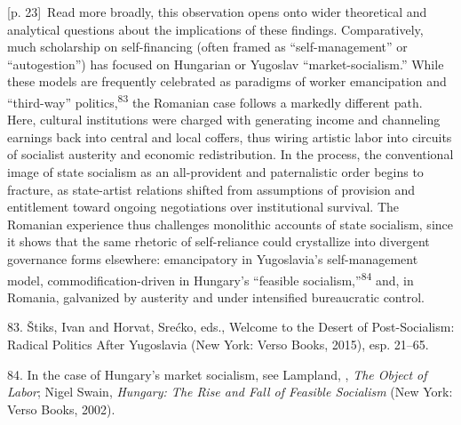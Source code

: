 \documentclass[10pt,a4paper]{article}
\begin{document}
{\scriptsize\color{gray} [p. 23]}\ Read more broadly, this observation opens onto wider theoretical and analytical questions about the implications of these findings. Comparatively, much scholarship on self-financing (often framed as “self-management” or “autogestion”) has focused on Hungarian or Yugoslav “market-socialism.” While these models are frequently celebrated as paradigms of worker emancipation and “third-way” politics,\nobreak\textsuperscript{83} the Romanian case follows a markedly different path. Here, cultural institutions were charged with generating income and channeling earnings back into central and local coffers, thus wiring artistic labor into circuits of socialist austerity and economic redistribution. In the process, the conventional image of state socialism as an all-provident and paternalistic order begins to fracture, as state-artist relations shifted from assumptions of provision and entitlement toward ongoing negotiations over institutional survival. The Romanian experience thus challenges monolithic accounts of state socialism, since it shows that the same rhetoric of self-reliance could crystallize into divergent governance forms elsewhere: emancipatory in Yugoslavia’s self-management model, commodification-driven in Hungary’s “feasible socialism,”\nobreak\textsuperscript{84} and, in Romania, galvanized by austerity and under intensified bureaucratic control.\par{\small 83. Štiks, Ivan and Horvat, Srećko, eds., Welcome to the Desert of Post-Socialism: Radical Politics After Yugoslavia (New York: Verso Books, 2015), esp. 21–65.\par}{\small 84. In the case of Hungary’s market socialism, see Lampland, , \textit{The Object of Labor}; Nigel Swain, \textit{Hungary: The Rise and Fall of Feasible Socialism} (New York: Verso Books, 2002).\par}
\end{document}
